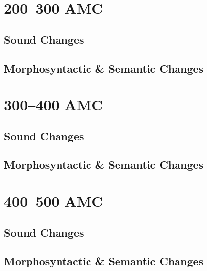 \documentclass[a4paper,11pt,twoside,openany]{memoir}
\begin{document}


\section{200--300 AMC}

\subsection{Sound Changes}



\subsection{Morphosyntactic \& Semantic Changes}



\section{300--400 AMC}

\subsection{Sound Changes}



\subsection{Morphosyntactic \& Semantic Changes}



\section{400--500 AMC}

\subsection{Sound Changes}



\subsection{Morphosyntactic \& Semantic Changes}
\end{document}
